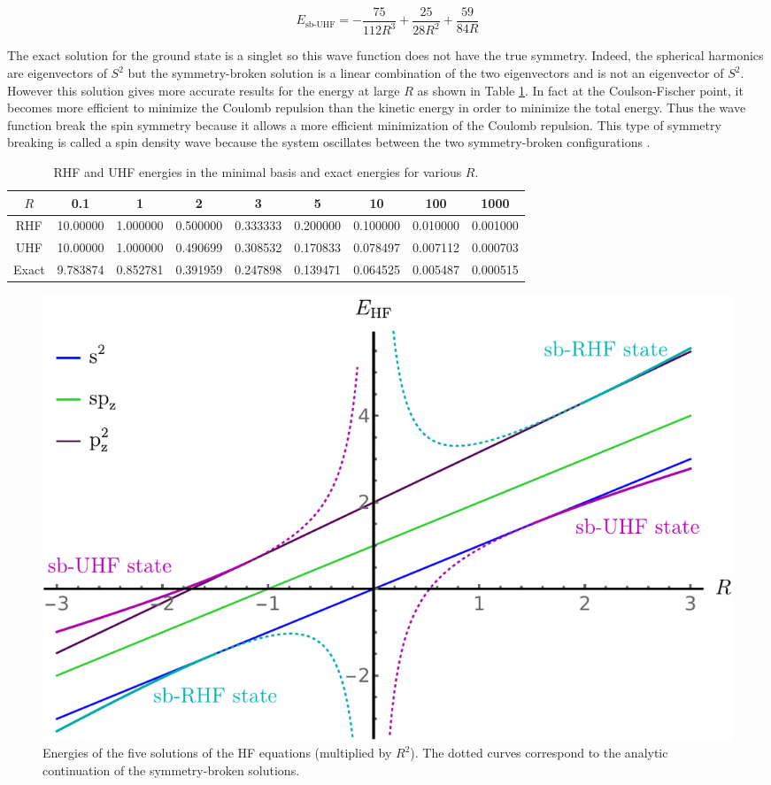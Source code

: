 \documentclass[11pt,a4paper]{article}
\begin{document}
\begin{equation}\label{eq:EsbUHF}
	E_{\text{sb-UHF}}=-\frac{75}{112R^3}+\frac{25}{28R^2}+\frac{59}{84R}
\end{equation}

The exact solution for the ground state is a singlet so this wave function does not have the true symmetry. Indeed, the spherical harmonics are eigenvectors of $S^2$ but the symmetry-broken solution is a linear combination of the two eigenvectors and is not an eigenvector of $S^2$. However this solution gives more accurate results for the energy at large $R$ as shown in Table \ref{tab:ERHFvsEUHF}. In fact at the Coulson-Fischer point, it becomes more efficient to minimize the Coulomb repulsion than the kinetic energy in order to minimize the total energy. Thus the wave function break the spin symmetry because it allows a more efficient minimization of the Coulomb repulsion. This type of symmetry breaking is called a spin density wave because the system oscillates between the two symmetry-broken configurations \cite{GiulianiBook}.

\begin{table}[h!]
\centering
\caption{\centering RHF and UHF energies in the minimal basis and exact energies for various $R$.}
\begin{tabular}{ccccccccc}
\hline
\hline
$R$ & 0.1 & 1 & 2 & 3 & 5 & 10 & 100 & 1000 \\
\hline
RHF 	& 10.00000 & 1.000000 & 0.500000 & 0.333333 & 0.200000 & 0.100000 & 0.010000 & 0.001000 \\
UHF 	& 10.00000 & 1.000000 & 0.490699 & 0.308532 & 0.170833 & 0.078497 & 0.007112 & 0.000703 \\
Exact 	& 9.783874 & 0.852781 & 0.391959 & 0.247898 & 0.139471 & 0.064525 & 0.005487 & 0.000515 \\
\hline
\hline
\end{tabular}
\label{tab:ERHFvsEUHF}
\end{table}


\begin{figure}
    \centering
    \includegraphics[width=\linewidth]{EsbHF.pdf}
    \caption{Energies of the five solutions of the HF equations (multiplied by $R^2$). The dotted curves correspond to the analytic continuation of the symmetry-broken solutions.}
    \label{fig:SpheriumNrj}
\end{figure}
\end{document}
